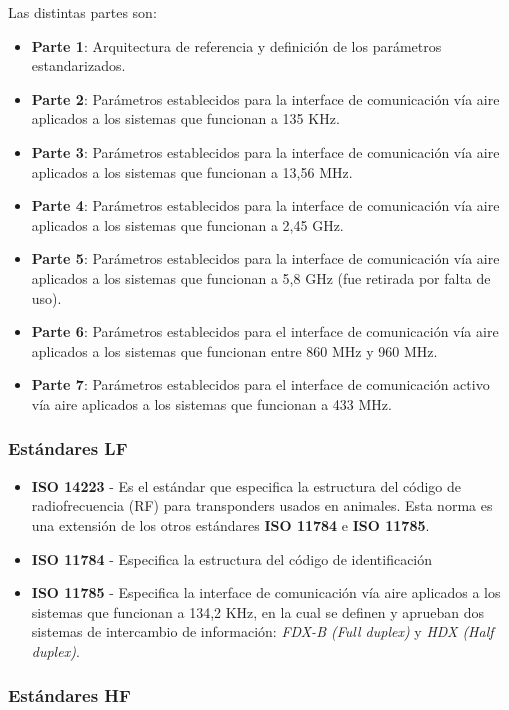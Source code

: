 Las distintas partes son:
\begin{itemize}
\item \textbf{Parte 1}: Arquitectura de referencia y definición de los parámetros estandarizados.
\item \textbf{Parte 2}: Parámetros establecidos para la interface de comunicación vía aire aplicados a los sistemas que funcionan a 135 KHz.
\item \textbf{Parte 3}: Parámetros establecidos para la interface de comunicación vía aire aplicados a los sistemas que funcionan a 13,56 MHz.
\item \textbf{Parte 4}: Parámetros establecidos para la interface de comunicación vía aire aplicados a los sistemas que funcionan a  2,45 GHz.
\item \textbf{Parte 5}: Parámetros establecidos para la interface de comunicación vía aire aplicados a los sistemas que funcionan a 5,8 GHz (fue retirada por falta de uso).
\item \textbf{Parte 6}: Parámetros establecidos para el interface de comunicación vía aire aplicados a los sistemas que funcionan entre 860 MHz y 960 MHz.
\item \textbf{Parte 7}: Parámetros establecidos para el interface de comunicación activo vía aire aplicados a los sistemas que funcionan a 433 MHz.
\end{itemize}

\subsubsection{Estándares LF}

\begin{itemize}
\item \textbf{ISO 14223} - Es el estándar que especifica la estructura del código de radiofrecuencia (RF) para transponders usados en animales. Esta norma es una extensión de los otros estándares \textbf{ISO 11784} e \textbf{ISO 11785}.
\item \textbf{ISO 11784} - Especifica la estructura del código de identificación
\item \textbf{ISO 11785} - Especifica la interface de comunicación vía aire aplicados a los sistemas que funcionan a 134,2 KHz, en la cual se definen y aprueban dos sistemas de intercambio de información: \textit{FDX-B (Full duplex)} y \textit{HDX (Half duplex)}.
\end{itemize}

\subsubsection{Estándares HF} 

